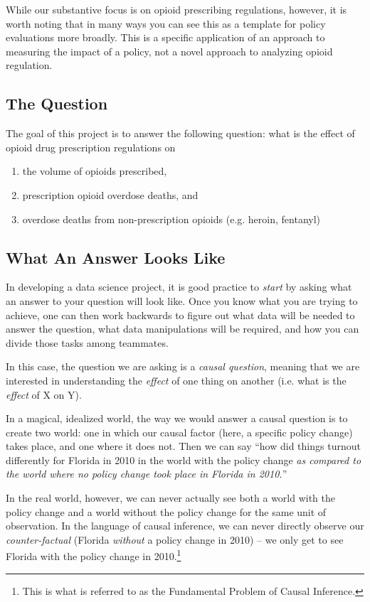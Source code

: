 \documentclass[12pt]{article}
\begin{document}
While our substantive focus is on opioid prescribing regulations, however, it is worth noting that in many ways you can see this as a template for policy evaluations more broadly. This is a specific application of an approach to measuring the impact of a policy, not a novel approach to analyzing opioid regulation.

\subsection*{The Question}

The goal of this project is to answer the following question: what is the effect of opioid drug prescription regulations on

\begin{enumerate}
  \item the volume of opioids prescribed,
  \item prescription opioid overdose deaths, and
  \item overdose deaths from non-prescription opioids (e.g. heroin, fentanyl)
\end{enumerate}

\subsection*{What An Answer Looks Like}

In developing a data science project, it is good practice to \emph{start} by asking what an answer to your question will look like. Once you know what you are trying to achieve, one can then work backwards to figure out what data will be needed to answer the question, what data manipulations will be required, and how you can divide those tasks among teammates.

In this case, the question we are asking is a \emph{causal question}, meaning that we are interested in understanding the \emph{effect} of one thing on another (i.e. what is the \emph{effect} of X on Y).

In a magical, idealized world, the way we would answer a causal question is to create two world: one in which our causal factor (here, a specific policy change) takes place, and one where it does not. Then we can say ``how did things turnout differently for Florida in 2010 in the world with the policy change \emph{as compared to the world where no policy change took place in Florida in 2010.}''

In the real world, however, we can never actually see both a world with the policy change and a world without the policy change for the same unit of observation. In the language of causal inference, we can never directly observe our \emph{counter-factual} (Florida \emph{without} a policy change in 2010) -- we only get to see Florida with the policy change in 2010.\footnote{This is what is referred to as the Fundamental Problem of Causal Inference.}
\end{document}
